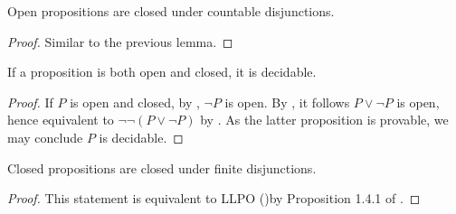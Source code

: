 \begin{lemma}\label{OpenCountableDisjunction}
  Open propositions are closed under countable disjunctions. 
\end{lemma}
\begin{proof}
  Similar to the previous lemma. 
\end{proof}

\begin{corollary}\label{ClopenDecidable}
  If a proposition is both open and closed, it is decidable. 
\end{corollary}
\begin{proof}
  If $P$ is open and closed, by , $\neg P$ is open.
  By , it follows $P\vee \neg P$ is open, 
  hence 
  equivalent to $\neg \neg (P \vee \neg P)$ by .
  As the latter proposition is provable, we may conclude $P$ is decidable. 
%  
\end{proof}

\begin{lemma}\label{ClosedFiniteDisjunction} 
  Closed propositions are closed under finite disjunctions. 
\end{lemma}
\begin{proof}
  This statement is equivalent to LLPO ()by  
  Proposition 1.4.1 of \cite{HannesDiener}. 
\end{proof}

